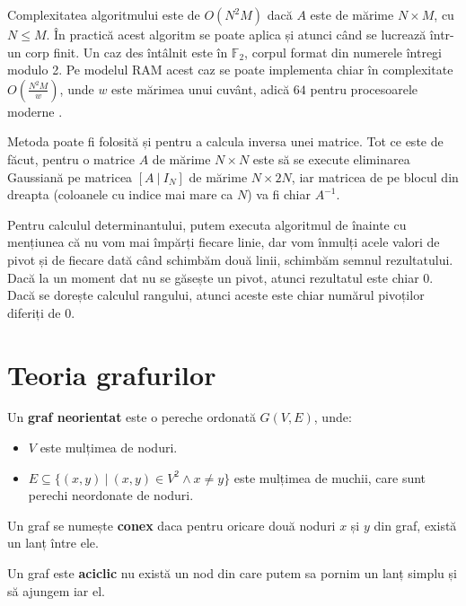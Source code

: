 Complexitatea algoritmului este de $O(N^{2}M)$ dacă $A$ este de mărime $N \times M$, cu $N \leq M$.
În practică acest algoritm se poate aplica și atunci când se lucrează într-un corp finit.
Un caz des întâlnit este în $\mathbb{F}_{2}$, corpul format din numerele întregi
modulo 2. Pe modelul RAM acest caz se poate implementa chiar în complexitate
$O(\frac{N^{2}M}{w})$, unde $w$ este mărimea unui cuvânt, adică $64$ pentru
procesoarele moderne \cite{gaussf2}.

Metoda poate fi folosită și pentru a calcula inversa unei matrice. Tot ce este de făcut, pentru o matrice
$A$ de mărime $N \times N$ este să se execute eliminarea Gaussiană pe matricea $[A\ |\ I_{N}]$ de mărime $N \times 2N$,
iar matricea de pe blocul din dreapta (coloanele  cu indice mai mare ca $N$) va fi chiar $A^{-1}$.

Pentru calculul determinantului, putem executa algoritmul de înainte cu mențiunea că nu vom mai împărți fiecare
linie, dar vom înmulți acele valori de pivot și de fiecare dată când schimbăm două linii, schimbăm semnul
rezultatului. Dacă la un moment dat nu se găsește un pivot, atunci rezultatul este chiar $0$. Dacă se
dorește calculul rangului, atunci aceste este chiar numărul pivoților diferiți de $0$.

\pagebreak

\section{Teoria grafurilor}

\begin{defn}
  Un \textbf{graf neorientat} este o pereche ordonată $G(V, E)$, unde:
  \begin{itemize}
    \item{$V$ este mulțimea de noduri}.
    \item{$E \subseteq \{(x, y)\ |\ (x, y) \in V^2 \land x \neq y\}$ este
      mulțimea de muchii, care sunt perechi neordonate de noduri}.
  \end{itemize}
\end{defn}

\begin{defn}
  Un graf se numește \textbf{conex} daca pentru oricare două noduri $x$ și $y$ din graf,
  există un lanț între ele.
\end{defn}

\begin{defn}
  Un graf este \textbf{aciclic} nu există un nod din care putem sa pornim un
  lanț simplu și să ajungem iar el.
\end{defn}

